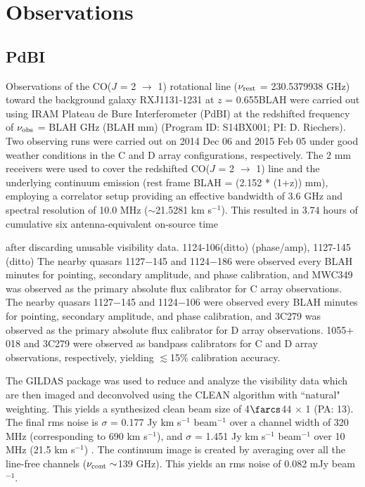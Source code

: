 \documentclass[]{emulateapj}
\begin{document}
\author{Draft}


\section{Observations}
\subsection{PdBI} \label{sec:PdBIdata}
Observations of the CO($J$ = 2 $\rightarrow$ 1) rotational line ($\nu_{\rm
rest}$ = 230.5379938 GHz) toward the background galaxy RXJ1131-1231 at $z$ = 
0.655BLAH
 were carried out using IRAM Plateau de Bure Interferometer (PdBI) at the
redshifted frequency of $\nu_{\rm obs}$ = 
 BLAH GHz (BLAH mm) (Program ID: S14BX001; PI: D. Riechers). 
 Two observing runs were carried out on 2014 Dec 06 and 2015 Feb 05 under good
weather conditions in the C and D array configurations, respectively. The 2 mm
receivers were used to cover the redshifted CO($J$ = 2 $\rightarrow$ 1) line
and the 
underlying continuum emission (rest frame BLAH = (2.152 * (1+z)) mm), employing
a correlator setup providing an effective bandwidth of 3.6 GHz and spectral 
resolution of 10.0 MHz ($\sim$21.5281 km s$^{-1}$).
This resulted in 3.74 hours of cumulative six antenna-equivalent on-source time

after discarding unusable visibility data.
1124-106(ditto)
(phase/amp), 1127-145 (ditto)
The nearby quasars 1127$-$145 and 1124$-$186 were observed every BLAH minutes
for
pointing, secondary amplitude, and phase calibration, and MWC349 was observed
as the primary
absolute flux calibrator for C array observations.
The nearby quasars 1127$-$145 and 1124$-$106 were observed every BLAH minutes
for
pointing, secondary amplitude, and phase calibration, and 3C279 was observed as
the primary
absolute flux calibrator for D array observations.
1055$+$018 and 3C279 were observed as bandpass calibrators for C and D array
observations, respectively, yielding $\lesssim
$15\% calibration accuracy.

The GILDAS package was used to reduce and analyze the visibility data which are
then imaged and deconvolved using
the CLEAN algorithm with ``natural" weighting. This yields a synthesized clean
beam size of 4$\farcs$44 $\times$ 1 (PA: 13\degr). The final rms noise is $\sigma$ =
0.177 
Jy km s$^{-1}$ beam$^{-1}$ over a channel width of 320 MHz (corresponding to
690 km s$^{-1}$), and $\sigma$ = 1.451 Jy km s$^{-1}$ beam$^{-1}$ over 10 MHz 
(21.5 km s$^{-1}$) . 
The continuum image is created by %
averaging over all the line-free channels ($\nu_{\rm cont}\sim$139 GHz). This
yields an rms noise of 0.082 mJy beam$^{-1}$. %
\end{document}
